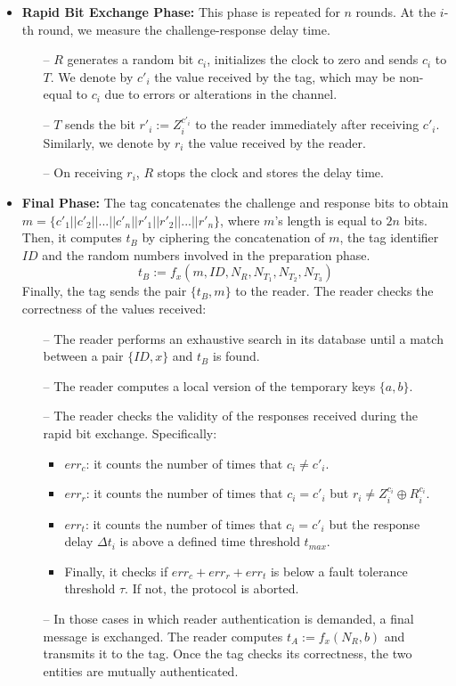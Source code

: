 \documentclass{article}
\newcommand \thr {\tau}
\begin{document}
\begin{itemize}
 \item \textbf{Rapid Bit Exchange Phase:} This phase is repeated for $n$ rounds. At the $i$-th round, we measure the challenge-response delay time.
    \begin{itemize}
             \item[--] $R$  generates a random bit $c_i$, initializes the clock to zero and sends $c_i$ to $T$. We denote by $c'_i$ the value received by the tag, which may be non-equal to $c_i$ due to errors or alterations in the channel.
             \item[--] $T$ sends the bit $r'_i:=Z_i^{c'_i}$ to the reader immediately after receiving $c'_i$. Similarly, we denote by $r_i$ the value received by the reader.
             \item[--] On receiving $r_i$, $R$ stops the clock and stores the delay time.
    \end{itemize}
\item \textbf{Final Phase:} The tag concatenates the challenge and response bits to obtain $m= \{c'_1 || c'_2 || ... || c'_n || r'_1 || r'_2 || ... || r'_n \}$, where $m$'s length is equal to $2n$ bits.  Then, it computes $t_B$ by ciphering the concatenation of $m$, the tag identifier $ID$ and the random numbers involved in the preparation phase.
    \begin{equation*}
    t_B :=f_x(m, ID, N_{R}, N_{T_{1}}, N_{T_{2}}, N_{T_{3}})
    \end{equation*}
    Finally, the tag sends the pair $\{t_B, m\}$ to the reader.
    The reader checks the correctness of the values received:
    \begin{itemize}
      \item [--] The reader performs an exhaustive search in its database until a match between a pair $\{ID, x\}$ and $t_B$ is found.
      \item [--] The reader computes a local version of the temporary keys $\{a, b\}$. \item [--] The reader checks the validity of the responses received during the rapid bit exchange. Specifically:
      \begin{itemize}
        \item $err_c$: it counts the number of times that $c_i \neq c'_i$.
        \item $err_r$: it counts the number of times that $c_{i} = c'_{i}$ but $r_{i}\neq Z_{i}^{c_{i}} \oplus R_{i}^{c_{i}}$.
        \item $err_t$: it counts the number of times that $c_{i} = c'_{i}$ but the response delay $\Delta t_{i}$ is above a defined time threshold $t_{max}$.
        \item Finally, it checks if $err_c + err_r + err_t $ is below a fault tolerance threshold $\thr$. If not, the protocol is aborted.
      \end{itemize}
    \item[--]In those cases in which reader authentication is demanded, a final message is exchanged. The reader computes $t_{A}:=f_{x}(N_{R}, b)$ and transmits it to the tag. Once the tag checks its correctness, the two entities are mutually authenticated.
    \end{itemize}
\end{itemize}
\end{document}
